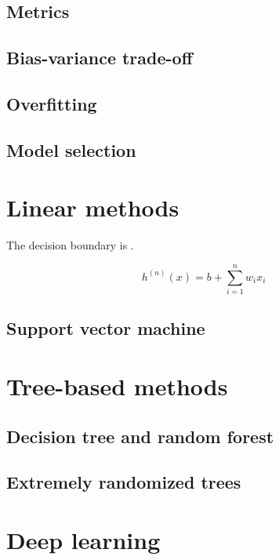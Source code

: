 \subsection{Metrics}

\subsection{Bias-variance trade-off}

\subsection{Overfitting}

\subsection{Model selection}

\section{Linear methods}

The decision boundary is . 

\begin{equation}
h^(n)(x) = b + \sum_{i=1}^n w_i x_i 
\end{equation} 

\subsection{Support vector machine}

\section{Tree-based methods}

\subsection{Decision tree and random forest}

\subsection{Extremely randomized trees}

\section{Deep learning}

